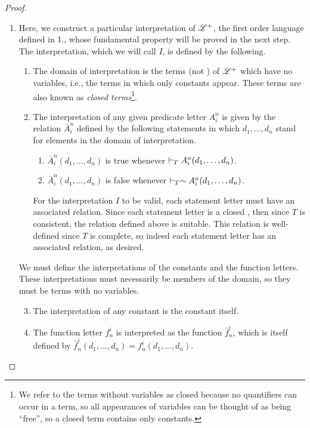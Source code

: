 \begin{proposition}
\begin{proof}
\begin{enumerate}
        \item Here, we construct a particular interpretation of \(\mathscr{L}^+\), the first order language defined in 1., whose fundamental property will be proved in the next step. The interpretation, which we will call \(I\), is defined by the following.
          \begin{enumerate}
            \item The domain of interpretation is the terms (not \wfs{}) of \(\mathscr{L}^+\) which have no variables, i.e., the terms in which only constants appear. These terms are also known as \textit{closed terms}\footnote{We refer to the terms without variables as closed because no quantifiers can occur in a term, so all appearances of variables can be thought of as being ``free'', so a closed term contains only constants.}.

            \item The interpretation of any given predicate letter \(A^n_i\) is given by the relation \(\bar{A}^n_i\) defined by the following statements in which \(d_1, \dots, d_n\) stand for elements in the domain of interpretation.
              \begin{enumerate}
                \item \(\bar{A}^n_i(d_1, \dots, d_n)\) is true whenever \(\vdash_{T} A^n_i(d_1, \dots, d_n)\).
                \item \(\bar{A}^n_i(d_1, \dots, d_n)\) is false whenever \(\vdash_{T} \sim A^n_i(d_1, \dots, d_n)\).
              \end{enumerate}
              For the interpretation \(I\) to be valid, each statement letter must have an associated relation. Since each statement letter is a closed \wf{}, then since \(T\) is consistent, the relation defined above is suitable. This relation is well-defined since \(T\) is complete, so indeed each statement letter has an associated relation, as desired.
          \end{enumerate}

          We must define the interpretations of the constants and the function letters. These interpretations must necessarily be members of the domain, so they must be terms with no variables.
          \begin{enumerate}
            \setcounter{enumii}{2}
            \item The interpretation of any constant is the constant itself.

            \item The function letter \(f^i_n\) is interpreted as the function \({\bar{f}}^i_n\), which is itself defined by \(\bar{f}^i_n(d_1, \dots, d_n) = f^i_n(d_1, \dots, d_n)\).


\end{enumerate}
\end{enumerate}
\end{proof}
\end{proposition}
